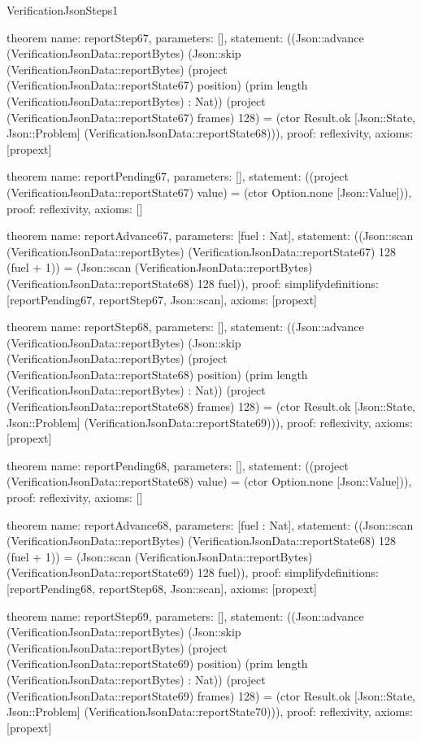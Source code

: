 \begin{lexlean}{VerificationJsonSteps1}
\begin{semanticmodule}
theorem{
  name: reportStep67,
  parameters: [],
  statement: ((Json::advance (VerificationJsonData::reportBytes) (Json::skip (VerificationJsonData::reportBytes) (project (VerificationJsonData::reportState67) position) (prim length (VerificationJsonData::reportBytes) : Nat)) (project (VerificationJsonData::reportState67) frames) 128) = (ctor Result.ok [Json::State, Json::Problem] (VerificationJsonData::reportState68))),
  proof: reflexivity{},
  axioms: [propext]
}

theorem{
  name: reportPending67,
  parameters: [],
  statement: ((project (VerificationJsonData::reportState67) value) = (ctor Option.none [Json::Value])),
  proof: reflexivity{},
  axioms: []
}

theorem{
  name: reportAdvance67,
  parameters: [fuel : Nat],
  statement: ((Json::scan (VerificationJsonData::reportBytes) (VerificationJsonData::reportState67) 128 (fuel + 1)) = (Json::scan (VerificationJsonData::reportBytes) (VerificationJsonData::reportState68) 128 fuel)),
  proof: simplify{definitions: [reportPending67, reportStep67, Json::scan]},
  axioms: [propext]
}

theorem{
  name: reportStep68,
  parameters: [],
  statement: ((Json::advance (VerificationJsonData::reportBytes) (Json::skip (VerificationJsonData::reportBytes) (project (VerificationJsonData::reportState68) position) (prim length (VerificationJsonData::reportBytes) : Nat)) (project (VerificationJsonData::reportState68) frames) 128) = (ctor Result.ok [Json::State, Json::Problem] (VerificationJsonData::reportState69))),
  proof: reflexivity{},
  axioms: [propext]
}

theorem{
  name: reportPending68,
  parameters: [],
  statement: ((project (VerificationJsonData::reportState68) value) = (ctor Option.none [Json::Value])),
  proof: reflexivity{},
  axioms: []
}

theorem{
  name: reportAdvance68,
  parameters: [fuel : Nat],
  statement: ((Json::scan (VerificationJsonData::reportBytes) (VerificationJsonData::reportState68) 128 (fuel + 1)) = (Json::scan (VerificationJsonData::reportBytes) (VerificationJsonData::reportState69) 128 fuel)),
  proof: simplify{definitions: [reportPending68, reportStep68, Json::scan]},
  axioms: [propext]
}

theorem{
  name: reportStep69,
  parameters: [],
  statement: ((Json::advance (VerificationJsonData::reportBytes) (Json::skip (VerificationJsonData::reportBytes) (project (VerificationJsonData::reportState69) position) (prim length (VerificationJsonData::reportBytes) : Nat)) (project (VerificationJsonData::reportState69) frames) 128) = (ctor Result.ok [Json::State, Json::Problem] (VerificationJsonData::reportState70))),
  proof: reflexivity{},
  axioms: [propext]
}


\end{semanticmodule}
\end{lexlean}
